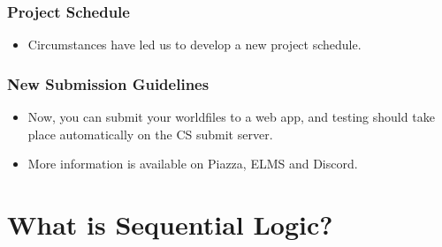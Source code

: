 \documentclass{beamer}
\begin{document}
       		\begin{frame}
       			\frametitle{Project Schedule}
       			\begin{itemize}
       				\item Circumstances have led us to develop a new project schedule.
       			\end{itemize}
       		\end{frame}
       		
       		\begin{frame}
       			\frametitle{New Submission Guidelines}
       			\begin{itemize}
       				\item Now, you can submit your worldfiles to a web app, and testing should take place automatically on the CS submit server.
       				\item More information is available on Piazza, ELMS and Discord.
       			\end{itemize}
       		\end{frame}
        
    
   	\section{What is Sequential Logic?}
   	
\end{document}
